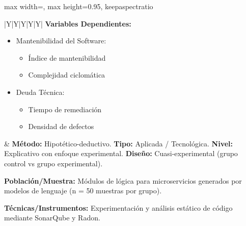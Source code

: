 \begin{landscape}
\begin{adjustbox}{max width=\linewidth, max height=0.95\textheight, keepaspectratio}
\begin{tabularx}{\linewidth}{|Y|Y|Y|Y|Y|}
\textbf{Variables Dependientes:}
\begin{itemize}[leftmargin=*, nosep]
    \item Mantenibilidad del Software:
    \begin{itemize}[nosep]
        \item Índice de mantenibilidad
        \item Complejidad ciclomática
    \end{itemize}
    \item Deuda Técnica:
    \begin{itemize}[nosep]
        \item Tiempo de remediación
        \item Densidad de defectos
    \end{itemize}
\end{itemize}
&
\textbf{Método:} Hipotético-deductivo. \newline
\textbf{Tipo:} Aplicada / Tecnológica. \newline
\textbf{Nivel:} Explicativo con enfoque experimental. \newline
\textbf{Diseño:} Cuasi-experimental (grupo control vs grupo experimental). \newline

\textbf{Población/Muestra:} \newline
Módulos de lógica para microservicios generados por modelos de lenguaje (n = 50 muestras por grupo). \newline

\textbf{Técnicas/Instrumentos:} \newline
Experimentación y análisis estático de código mediante SonarQube y Radon.\\ \hline

\end{tabularx}
\end{adjustbox}
\end{landscape}